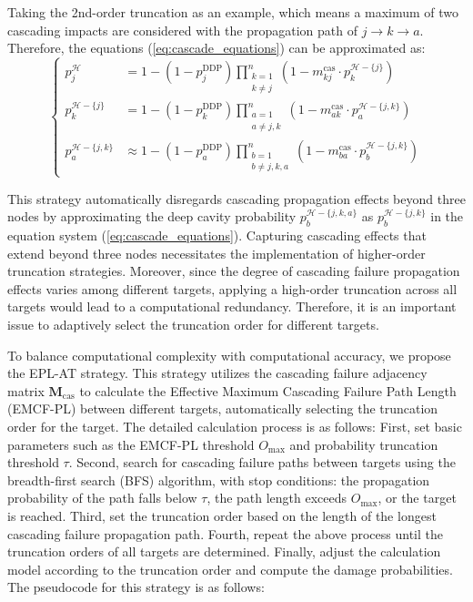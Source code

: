 \documentclass[lettersize,journal]{IEEEtran}
\begin{document}
Taking the 2nd-order truncation as an example, which means a maximum of two cascading impacts are considered with the propagation path of $j \rightarrow k \rightarrow a$. Therefore, the equations (\ref{eq:cascade_equations}) can be approximated as:
\begin{equation}
\left\{
\begin{aligned}
p_j^{\mathcal{H}} &= 1 - (1-p_j^{\text{DDP}}) \prod_{\substack{k = 1 \\ k \ne j}}^{n} (1-m_{kj}^{\text{cas}} \cdot p_k^{\mathcal{H}-\{j\}}) \\[1ex]
p_k^{\mathcal{H}-\{j\}} &= 1 - (1-p_k^{\text{DDP}}) \prod_{\substack{a = 1 \\ a \ne j,k}}^{n} (1-m_{ak}^{\text{cas}} \cdot p_a^{\mathcal{H}-\{j,k\}}) \\[1ex]
p_a^{\mathcal{H}-\{j,k\}} &\approx 1 - (1-p_a^{\text{DDP}}) \prod_{\substack{b = 1 \\ b \ne j,k,a}}^{n} (1-m_{ba}^{\text{cas}} \cdot p_b^{\mathcal{H}-\{j,k\}})
\end{aligned}
\right.
\label{eq:truncation_example}
\end{equation}

This strategy automatically disregards cascading propagation effects beyond three nodes by approximating the deep cavity probability $p_b^{\mathcal{H}-\{j,k,a\}}$ as $p_b^{\mathcal{H}-\{j,k\}}$ in the equation system (\ref{eq:cascade_equations}). Capturing cascading effects that extend beyond three nodes necessitates the implementation of higher-order truncation strategies. Moreover, since the degree of cascading failure propagation effects varies among different targets, applying a high-order truncation across all targets would lead to a computational redundancy. Therefore, it is an important issue to adaptively select the truncation order for different targets.

To balance computational complexity with computational accuracy, we propose the EPL-AT strategy. This strategy utilizes the cascading failure adjacency matrix $\mathbf{M}_{\text{cas}}$ to calculate the Effective Maximum Cascading Failure Path Length (EMCF-PL) between different targets, automatically selecting the truncation order for the target. The detailed calculation process is as follows: 
First, set basic parameters such as the EMCF-PL threshold $O_{\text{max}}$ and probability truncation threshold $\tau$.
Second, search for cascading failure paths between targets using the breadth-first search (BFS) algorithm, with stop conditions: the propagation probability of the path falls below $\tau$, the path length exceeds $O_{\text{max}}$, or the target is reached.
Third, set the truncation order based on the length of the longest cascading failure propagation path.
Fourth, repeat the above process until the truncation orders of all targets are determined.
Finally, adjust the calculation model according to the truncation order and compute the damage probabilities. 
The pseudocode for this strategy is as follows:
\end{document}
